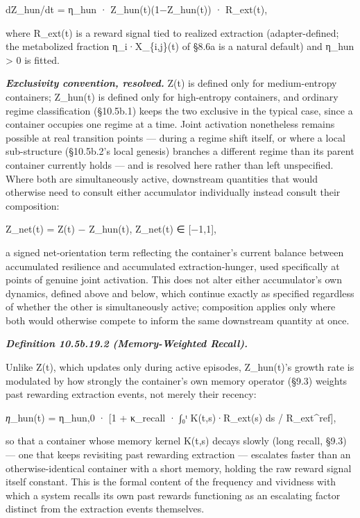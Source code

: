 \documentclass[
]{article}
\begin{document}
dZ\_hun/dt = η\_hun · Z\_hun(t)(1−Z\_hun(t)) · R\_ext(t),

where R\_ext(t) is a reward signal tied to realized extraction
(adapter-defined; the metabolized fraction η\_i·X\_\{i,j\}(t) of §8.6a
is a natural default) and η\_hun \textgreater{} 0 is fitted.

\emph{\textbf{Exclusivity convention, resolved.}} Z(t) is defined only
for medium-entropy containers; Z\_hun(t) is defined only for
high-entropy containers, and ordinary regime classification (§10.5b.1)
keeps the two exclusive in the typical case, since a container occupies
one regime at a time. Joint activation nonetheless remains possible at
real transition points --- during a regime shift itself, or where a
local sub-structure (§10.5b.2's local genesis) branches a different
regime than its parent container currently holds --- and is resolved
here rather than left unspecified. Where both are simultaneously active,
downstream quantities that would otherwise need to consult either
accumulator individually instead consult their composition:

Z\_net(t) = Z(t) − Z\_hun(t), Z\_net(t) ∈ {[}−1,1{]},

a signed net-orientation term reflecting the container's current balance
between accumulated resilience and accumulated extraction-hunger, used
specifically at points of genuine joint activation. This does not alter
either accumulator's own dynamics, defined above and below, which
continue exactly as specified regardless of whether the other is
simultaneously active; composition applies only where both would
otherwise compete to inform the same downstream quantity at once.

\emph{\textbf{Definition 10.5b.19.2 (Memory-Weighted Recall).}}

Unlike Z(t), which updates only during active episodes, Z\_hun(t)'s
growth rate is modulated by how strongly the container's own memory
operator (§9.3) weights past rewarding extraction events, not merely
their recency:

\emph{η}\_hun(t) = η\_hun,0 · {[}1 + κ\_recall · ∫₀ᵗ K(t,s)·R\_ext(s) ds
/ R\_ext\^{}ref{]},

so that a container whose memory kernel K(t,s) decays slowly (long
recall, §9.3) --- one that keeps revisiting past rewarding extraction
--- escalates faster than an otherwise-identical container with a short
memory, holding the raw reward signal itself constant. This is the
formal content of the frequency and vividness with which a system
recalls its own past rewards functioning as an escalating factor
distinct from the extraction events themselves.
\end{document}
